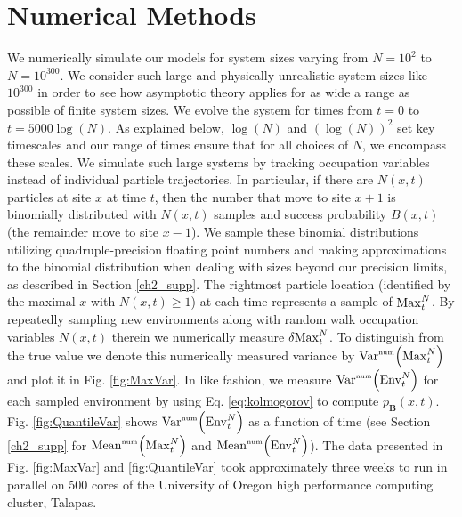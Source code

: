 \section{Numerical Methods}
We numerically simulate our models for system sizes varying from $N=10^2$ to $N=10^{300}$. We consider such large and physically unrealistic system sizes like $10^{300}$ in order to see how asymptotic theory applies for as wide a  range as possible of finite system sizes. We evolve the system for times from $t=0$ to $t= 5000 \log(N)$.  As explained below, $\log(N)$ and $(\log(N))^2$ set key timescales and our range of times ensure that for all choices of $N$, we encompass these scales. We simulate such large systems by tracking occupation variables instead of individual particle trajectories. In particular, if there are $N(x,t)$ particles at site $x$ at time $t$, then the number that move to site $x+1$ is binomially distributed with $N(x,t)$ samples and success probability $B(x,t)$ (the remainder move to site $x-1$). We sample these binomial distributions utilizing quadruple-precision floating point numbers and making approximations to the binomial distribution when dealing with sizes beyond our precision limits, as described in Section \ref{ch2_supp}. The rightmost particle location (identified by the maximal $x$ with $N(x,t)\geq 1$) at each time represents a sample of $\mathrm{Max}^{N}_t$. By repeatedly sampling new environments along with random walk occupation variables $N(x,t)$ therein we numerically measure $\var{\mathrm{Max}^{N}_t}$. To distinguish from the true value we denote this numerically measured variance by $\mathrm{Var}^{\textrm{\tiny{num}}}\!\left(\mathrm{Max}^{N}_t\right)$ and plot it in Fig. \ref{fig:MaxVar}. In like fashion, we measure $\mathrm{Var}^{\textrm{\tiny{num}}}\!\left(\mathrm{Env}^{N}_t\right)$ for each sampled environment by using Eq. \ref{eq:kolmogorov} to compute $p_{\mathbf{B}}(x,t)$.  Fig. \ref{fig:QuantileVar} shows $\mathrm{Var}^{\textrm{\tiny{num}}}\!\left(\mathrm{Env}^{N}_t\right)$ as a function of time (see  Section \ref{ch2_supp} for $\mathrm{Mean}^{\textrm{\tiny{num}}}\!\left(\mathrm{Max}^{N}_t\right)$ and $\mathrm{Mean}^{\textrm{\tiny{num}}}\!\left(\mathrm{Env}^{N}_t\right)$). The data presented in Fig. \ref{fig:MaxVar} and \ref{fig:QuantileVar} took approximately three weeks to run in parallel on 500 cores of the University of Oregon high performance computing cluster, Talapas.


